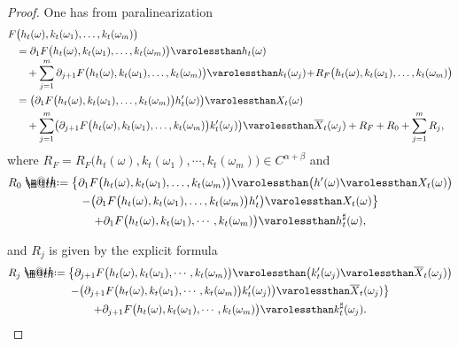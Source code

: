 \documentclass[10pt]{amsart}
\makeatletter
\theoremstyle{definition}
\newcommand*{\defeq}{\mathrel{\rlap{%
\raisebox{0.3ex}{$\m@th\cdot$}}%
\raisebox{-0.3ex}{$\m@th\cdot$}}%
=}
\makeatother
\begin{document}
\begin{proof}
One has from paralinearization
\begin{equation*} \begin{split}
F&\bigl(h_t(\omega), k_t(\omega_1),\dots, k_t(\omega_m)\bigr)\\
&= \partial_1F\bigl(h_t(\omega), k_t(\omega_1),\dots, k_t(\omega_m)\bigr) \varolessthan h_t(\omega) \\[-3pt]
&\quad+ \sum_{j=1}^m\partial_{j+1}F\bigl(h_t(\omega), k_t(\omega_1),\dots, k_t(\omega_m)\bigr) \varolessthan k_t(\omega_j)
\!+\! R_F\bigl(h_t(\omega), k_t(\omega_1),\dots, k_t(\omega_m)\bigr)\\
&=\bigl( \partial_1F\bigl(h_t(\omega), k_t(\omega_1),\dots, k_t(\omega_m)\bigr)h_t'(\omega) \bigr) \varolessthan X_t(\omega) \\
&\quad+ \sum_{j=1}^m\bigl(\partial_{j+1} F\bigl(h_t(\omega), k_t(\omega_1),\dots, k_t(\omega_m)\bigr)k_t'(\omega_j)\bigr) \varolessthan \overline X_t(\omega_j)+ R_F + R_0 + \sum_{j=1}^m R_j,
\end{split} \end{equation*}
where $R_F = R_F\bigl(h_t(\omega), k_t(\omega_1),\cdots, k_t(\omega_m)\bigr)\in C^{\alpha+\beta}$ and
\begin{multline*}
R_0\defeq \bigl\{\partial_1F\bigl(h_t(\omega), k_t(\omega_1), \dots, k_t(\omega_m)\bigr) \varolessthan\bigl(h'(\omega) \varolessthan X_t(\omega)\bigr) \\
- \bigl(\partial_1F\bigl(h_t(\omega), k_t(\omega_1), \dots, k_t(\omega_m)\bigr)h_t'\bigr) \varolessthan X_t(\omega) \bigr\} \\
+ \partial_1F\bigl(h_t(\omega), k_t(\omega_1),\cdots, k_t(\omega_m)\bigr) \varolessthan h_t^{\sharp}(\omega),
\end{multline*}
\par\noindent
\begin{minipage}{\textwidth}
and $R_j$ is given by the explicit formula
\begin{multline*}
R_j\defeq \bigl\{\partial_{j+1} F\bigl(h_t(\omega), k_t(\omega_1),\cdots, k_t(\omega_m)\bigr) \varolessthan \bigl( k_t'(\omega_j) \varolessthan \overline X_t(\omega_j)\bigr)
\\
-\bigl(\partial_{j+1} F\bigl(h_t(\omega), k_t(\omega_1),\cdots, k_t(\omega_m)\bigr) k_t'(\omega_j)\bigr) \varolessthan \overline X_t(\omega_j) \bigr\}
\\
+ \partial_{j+1} F\bigl(h_t(\omega), k_t(\omega_1),\cdots, k_t(\omega_m)\bigr) \varolessthan k_t^\sharp(\omega_j).
\end{multline*}

\end{minipage}
\end{proof}
\end{document}

